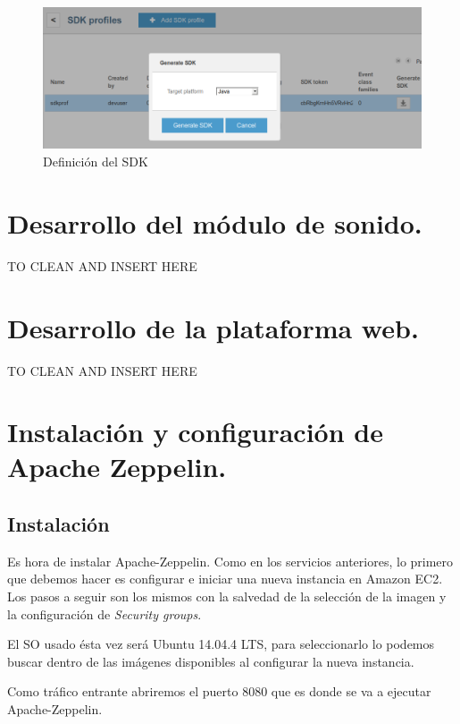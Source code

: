 \begin{figure}[!ht]
  \begin{center}
    \includegraphics[scale=0.30]{../images/sdk/2.png}
		\caption{Definición del SDK}
    \label{fig:kaa}
	\end{center}
\end{figure}

\newpage

\section{Desarrollo del módulo de sonido.}
TO CLEAN AND INSERT HERE
\newpage


\section{Desarrollo de la plataforma web.}
TO CLEAN AND INSERT HERE
\newpage


\section{Instalación y configuración de Apache Zeppelin.}

\subsection{Instalación}
Es hora de instalar Apache-Zeppelin. Como en los servicios anteriores, lo primero que debemos hacer es configurar e iniciar una nueva instancia en Amazon EC2. Los pasos a seguir son los mismos con la salvedad de la selección de la imagen y la configuración de \textit{Security groups}.

\bigskip

El SO usado ésta vez será Ubuntu 14.04.4 LTS, para seleccionarlo lo podemos buscar dentro de las imágenes disponibles al configurar la nueva instancia.

Como tráfico entrante abriremos el puerto 8080 que es donde se va a ejecutar Apache-Zeppelin.

